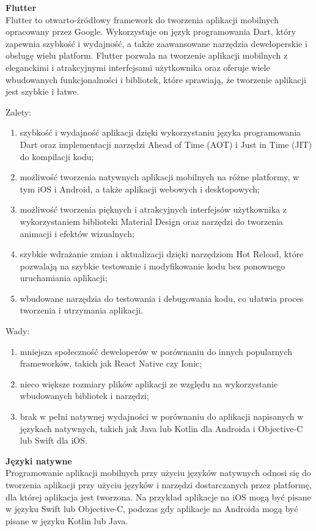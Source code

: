 \documentclass[12pt, a4paper, twoside, openany]{book}
\begin{document}
\textbf{Flutter\\}
Flutter to otwarto-źródłowy framework do tworzenia aplikacji mobilnych opracowany przez Google. Wykorzystuje on język programowania Dart, który zapewnia szybkość i wydajność, a także zaawansowane narzędzia deweloperskie i obsługę wielu platform. Flutter pozwala na tworzenie aplikacji mobilnych z eleganckimi i atrakcyjnymi interfejsami użytkownika oraz oferuje wiele wbudowanych funkcjonalności i bibliotek, które sprawiają, że tworzenie aplikacji jest szybkie i łatwe.
    
Zalety:
\begin{enumerate}[label=--]
    \item szybkość i wydajność aplikacji dzięki wykorzystaniu języka programowania Dart oraz implementacji narzędzi Ahead of Time (AOT) i Just in Time (JIT) do kompilacji kodu;
    \item możliwość tworzenia natywnych aplikacji mobilnych na różne platformy, w tym iOS i Android, a także aplikacji webowych i desktopowych;
    \item możliwość tworzenia pięknych i atrakcyjnych interfejsów użytkownika z wykorzystaniem biblioteki Material Design oraz narzędzi do tworzenia animacji i efektów wizualnych;
    \item szybkie wdrażanie zmian i aktualizacji dzięki narzędziom Hot Reload, które pozwalają na szybkie testowanie i modyfikowanie kodu bez ponownego uruchamiania aplikacji;
    \item wbudowane narzędzia do testowania i debugowania kodu, co ułatwia proces tworzenia i utrzymania aplikacji.
\end{enumerate}

Wady:
\begin{enumerate}[label=--]
 \item mniejsza społeczność deweloperów w porównaniu do innych popularnych frameworków, takich jak React Native czy Ionic;
 \item nieco większe rozmiary plików aplikacji ze względu na wykorzystanie wbudowanych bibliotek i narzędzi;
 \item brak w pełni natywnej wydajności w porównaniu do aplikacji napisanych w językach natywnych, takich jak Java lub Kotlin dla Androida i Objective-C lub Swift dla iOS.
\end{enumerate}

\textbf{Języki natywne\\}
Programowanie aplikacji mobilnych przy użyciu języków natywnych odnosi się do tworzenia aplikacji przy użyciu języków i narzędzi dostarczanych przez platformę, dla której aplikacja jest tworzona. Na przykład aplikacje na iOS mogą być pisane w języku Swift lub Objective-C, podczas gdy aplikacje na Androida mogą być pisane w języku Kotlin lub Java.
    
\end{document}
